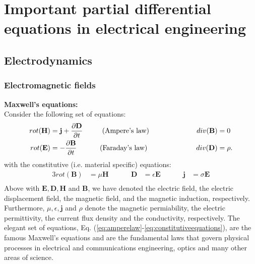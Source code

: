 
\chapter{Important partial differential equations in electrical engineering} 
\section{Electrodynamics}
\subsection{Electromagnetic fields}
\textbf{Maxwell's equations:} 
\\
Consider the following set of equations: 
\begin{alignat}{3}
  rot ( \mathbf{H} ) &= \mathbf{j}+\frac{\partial \mathbf{D}}{\partial t} &\hspace{0.5cm} &\text{ (Ampere's law)} &\hspace{2cm} div (\mathbf{B}) &= 0 \label{eq:amperelaw}\\
  rot ( \mathbf{E} ) &= -\frac{\partial \mathbf{B}}{\partial t} &\hspace{0.5cm} &\text{(Faraday's law)} &\hspace{2cm} div (\mathbf{D}) &= \rho \label{eq:faradaylaw}. 
\end{alignat}
with the constitutive (i.e. material specific) equations: 
\begin{alignat}{3}
  \label{eq:constitutiveequations}
   rot  ( \bm{B} ) &= \mu \bm{H} &\hspace{1cm}  \bm{D} &= \epsilon \bm{E} &\hspace{1cm}  \bm{j} &= \sigma \bm{E} \\
\end{alignat}
Above with $\bm{E},\bm{D}, \bm{H}$ and $\bm{B}$, we have denoted the electric field, the electric displacement field, the magnetic field, and the magnetic induction, respectively. Furthermore, $\mu ,\epsilon ,\bm{j} $ and $\rho$ denote the magnetic permiability, the electric permittivity, the current flux density and the conductivity, respectively. The elegant set of equations, Eq. (\ref{eq:amperelaw}-\ref{eq:constitutiveequations}), are the famous Maxwell's equations and are the fundamental laws that govern physical processes in electrical and communications engineering, optics and many other areas of science.\\

